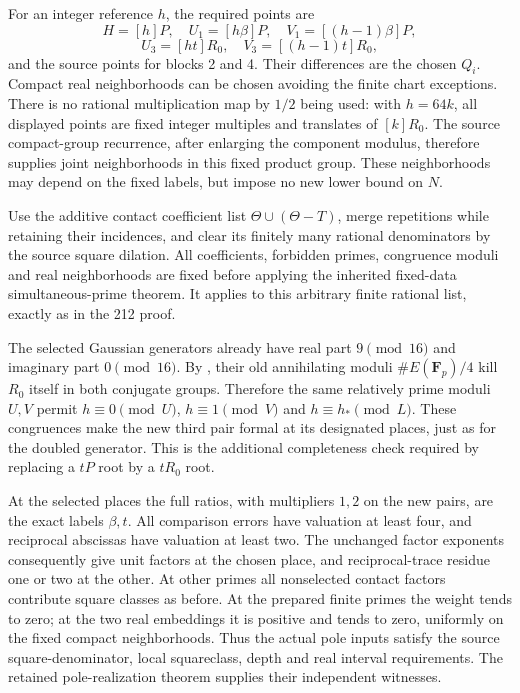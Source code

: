 \documentclass[11pt,a4paper]{article}
\begin{document}
For an integer reference $h$, the required points are
\[
 H=[h]P,\quad U_1=[h\beta]P,\quad V_1=[(h-1)\beta]P,
\]
\[
 U_3=[ht]R_0,\quad V_3=[(h-1)t]R_0,
\]
and the source points for blocks 2 and 4. Their differences are the
chosen $Q_i$. Compact real neighborhoods can be chosen avoiding the
finite chart exceptions. There is no rational multiplication map
by $1/2$ being used: with $h=64k$, all displayed points are fixed
integer multiples and translates of $[k]R_0$. The source compact-group
recurrence, after enlarging the component modulus, therefore supplies
joint neighborhoods in this fixed product group. These neighborhoods
may depend on the fixed labels, but impose no new lower bound on $N$.

Use the additive contact coefficient list
$\Theta\cup(\Theta-T)$, merge repetitions while retaining their
incidences, and clear its finitely many rational denominators by the
source square dilation. All coefficients, forbidden primes, congruence
moduli and real neighborhoods are fixed before applying the inherited
fixed-data simultaneous-prime theorem. It applies to this arbitrary
finite rational list, exactly as in the 212 proof.

The selected Gaussian generators already have real part $9\pmod{16}$
and imaginary part $0\pmod{16}$. By \cite[Lemma~5.1]{Weighted}, their
old annihilating moduli $\#E(\mathbf F_p)/4$ kill $R_0$ itself in
both conjugate groups. Therefore the same relatively prime moduli
$U,V$ permit $h\equiv0\pmod U$, $h\equiv1\pmod V$ and
$h\equiv h_*\pmod L$. These congruences make the new third pair
formal at its designated places, just as for the doubled generator.
This is the additional completeness check required by replacing a
$tP$ root by a $tR_0$ root.

At the selected places the full ratios, with multipliers $1,2$ on
the new pairs, are the exact labels $\beta,t$. All comparison errors
have valuation at least four, and reciprocal abscissas have valuation
at least two. The unchanged factor exponents consequently give unit
factors at the chosen place, and reciprocal-trace residue one or two
at the other. At other primes all nonselected contact factors
contribute square classes as before. At the prepared finite primes
the weight tends to zero; at the two real embeddings it is positive
and tends to zero, uniformly on the fixed compact neighborhoods.
Thus the actual pole inputs satisfy the source square-denominator,
local squareclass, depth and real interval requirements. The retained
pole-realization theorem supplies their independent witnesses.
\end{document}
